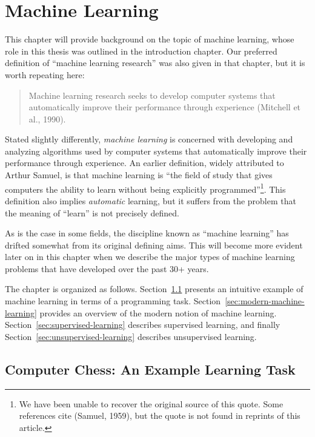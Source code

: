 \chapter{Machine Learning}
\label{ch:machine_learning}
%
This chapter will provide background on the topic of machine learning, whose role in this thesis was outlined in the introduction chapter. Our preferred definition of ``machine learning research'' was also given in that chapter, but it is worth repeating here:
%
\begin{quote}
Machine learning research seeks to develop computer systems that automatically improve their performance through experience (Mitchell et al., 1990).
\end{quote}
%	
Stated slightly differently, \emph{machine learning} is concerned with developing and analyzing algorithms used by computer systems that automatically improve their performance through experience. An earlier definition, widely attributed to Arthur Samuel, is that machine learning is ``the field of study that gives computers the ability to learn without being
explicitly programmed''\footnote{We have been unable to recover the original source of this quote. Some references cite (Samuel, 1959), but the quote is not found in reprints of this article.}. This definition also implies \emph{automatic} learning, but it suffers from the problem that the meaning of ``learn'' is not precisely defined.

As is the case in some fields, the discipline known as ``machine learning'' has drifted somewhat from its original defining aims. This will become more evident later on in this chapter when we describe the major types of machine learning problems that have developed over the past 30+ years.

The chapter is organized as follows. Section~\ref{sec:chess} presents an intuitive example of machine learning in terms of a programming task. Section~\ref{sec:modern-machine-learning} provides an overview of the modern notion of machine learning. Section~\ref{sec:supervised-learning} describes supervised learning, and finally Section~\ref{sec:unsupervised-learning} describes unsupervised learning. 


\section{Computer Chess: An Example Learning Task}
\label{sec:chess}

